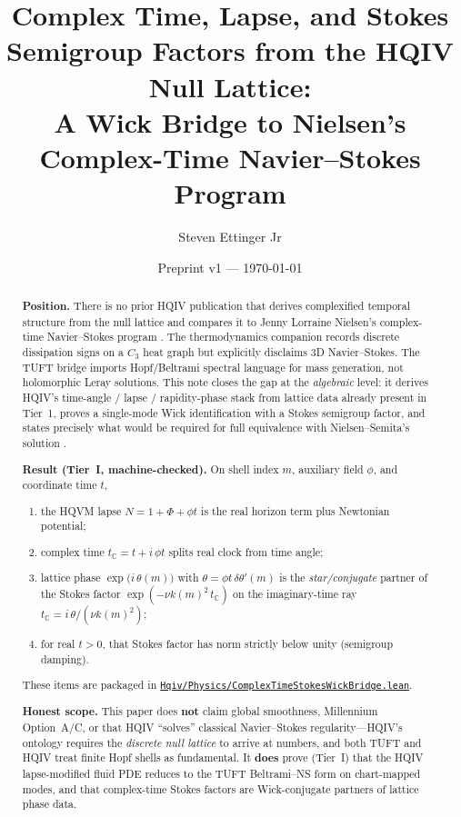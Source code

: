 \documentclass[11pt]{amsart}
\title[Complex time and Stokes from the HQIV lattice]{Complex Time, Lapse, and Stokes Semigroup Factors from the HQIV Null Lattice:\\
A Wick Bridge to Nielsen's Complex-Time Navier--Stokes Program}
\author{Steven Ettinger Jr}
\date{Preprint v1 --- \today}
\newcommand{\leanrepo}{https://github.com/HQIV/hqiv-lean/blob/main}
\newcommand{\leanfile}[1]{\href{\leanrepo/#1}{\nolinkurl{#1}}}
\begin{document}
\begin{abstract}
\noindent\textbf{Position.}
There is no prior HQIV publication that derives complexified temporal structure from the null
lattice and compares it to Jenny Lorraine Nielsen's complex-time Navier--Stokes program
\cite{NielsenSemitaNS2026,NielsenTUFT2026}.
The thermodynamics companion \cite{hqiv-thermo-arrow-paper} records discrete dissipation signs on a
$C_3$ heat graph but explicitly disclaims 3D Navier--Stokes.
The TUFT bridge \cite{hqiv-tuft-bridge-paper} imports Hopf/Beltrami spectral language for mass
generation, not holomorphic Leray solutions.
This note closes the gap at the \emph{algebraic} level: it derives HQIV's time-angle / lapse /
rapidity-phase stack from lattice data already present in Tier~1, proves a single-mode Wick
identification with a Stokes semigroup factor, and states precisely what would be required for
full equivalence with Nielsen--Semita's solution \cite{NielsenSemitaNS2026}.

\noindent\textbf{Result (Tier~I, machine-checked).}
On shell index $m$, auxiliary field $\phi$, and coordinate time $t$,
\begin{enumerate}[label=(\roman*),leftmargin=2em]
\item the HQVM lapse $N=1+\Phi+\phi t$ is the real horizon term plus Newtonian potential;
\item complex time $t_{\mathbb C}=t+i\,\phi t$ splits real clock from time angle;
\item lattice phase $\exp\bigl(i\,\theta(m)\bigr)$ with
  $\theta=\phi t\,\delta\theta'(m)$ is the \emph{star/conjugate} partner of the Stokes factor
  $\exp(-\nu k(m)^2\, t_{\mathbb C})$ on the imaginary-time ray
  $t_{\mathbb C}=i\,\theta/(\nu k(m)^2)$;
\item for real $t>0$, that Stokes factor has norm strictly below unity (semigroup damping).
\end{enumerate}
These items are packaged in \leanfile{Hqiv/Physics/ComplexTimeStokesWickBridge.lean}.

\noindent\textbf{Honest scope.}
This paper does \textbf{not} claim global smoothness, Millennium Option~A/C, or that HQIV
``solves'' classical Navier--Stokes regularity---HQIV's ontology requires the \emph{discrete null
lattice} to arrive at numbers, and both TUFT and HQIV treat finite Hopf shells as fundamental.
It \textbf{does} prove (Tier~I) that the HQIV lapse-modified fluid PDE reduces to the TUFT
Beltrami--NS form on chart-mapped modes, and that complex-time Stokes factors are Wick-conjugate
partners of lattice phase data.
\end{abstract}
\end{document}
